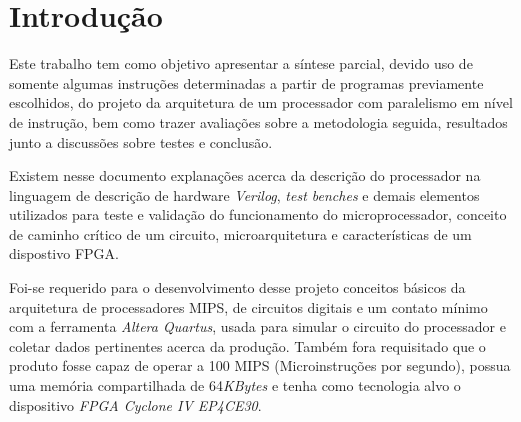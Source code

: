 \documentclass[
	11pt,				%
	openany,			%
	oneside,
	a4paper,			%
	chapter=TITLE,		%
	section=TITLE,		%
	english,			%
	brazil				%
	]{abntex2}
\begin{document}
\frenchspacing 





\textual

\pagestyle{uefs-pbl}

\imprimircabecalho

\begingroup
\let\clearpage\relax


\chapter{Introdução}
Este trabalho tem como objetivo apresentar a síntese parcial, devido uso de somente algumas instruções determinadas a partir de programas previamente escolhidos, do projeto da arquitetura de um processador com paralelismo em nível de instrução, bem como trazer avaliações sobre a metodologia seguida, resultados junto a discussões sobre testes e conclusão.

	Existem nesse documento explanações acerca da descrição do processador na linguagem de descrição de hardware \textit{Verilog}, \textit{test benches} e demais elementos utilizados para teste e validação do funcionamento do microprocessador, conceito de caminho crítico de um circuito, microarquitetura e características de um dispostivo FPGA.

	Foi-se requerido para o desenvolvimento desse projeto conceitos básicos da arquitetura de processadores MIPS, de circuitos digitais e um contato mínimo com a ferramenta \textit{Altera Quartus}, usada para simular o circuito do processador e coletar dados pertinentes acerca da produção. Também fora requisitado que o produto fosse capaz de operar a 100 MIPS (Microinstruções por segundo), possua uma memória compartilhada de 64\textit{KBytes} e tenha como tecnologia alvo o dispositivo \textit{FPGA Cyclone IV EP4CE30}.
    
\end{document}
